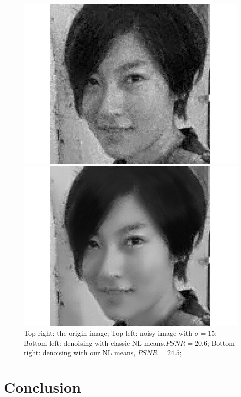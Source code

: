 \documentclass[runningheads]{llncs}
\begin{document}
\begin{figure}[!h]
\begin{minipage}{0.45\linewidth}
    \includegraphics[width=\linewidth]{byzh_eucli}
    \end{minipage}
    \begin{minipage}{0.45\linewidth}
    \includegraphics[width=\linewidth]{byzh_our}
    \end{minipage}
      \caption{Top right: the origin image; Top left: noisy image with $\sigma=15$; Bottom left: denoising with classic NL means,$PSNR=20.6$; Bottom right: denoising with our NL means, $PSNR=24.5$;}
      \label{byzh_de}
  \end{figure}  
\section{Conclusion}
\end{document}
